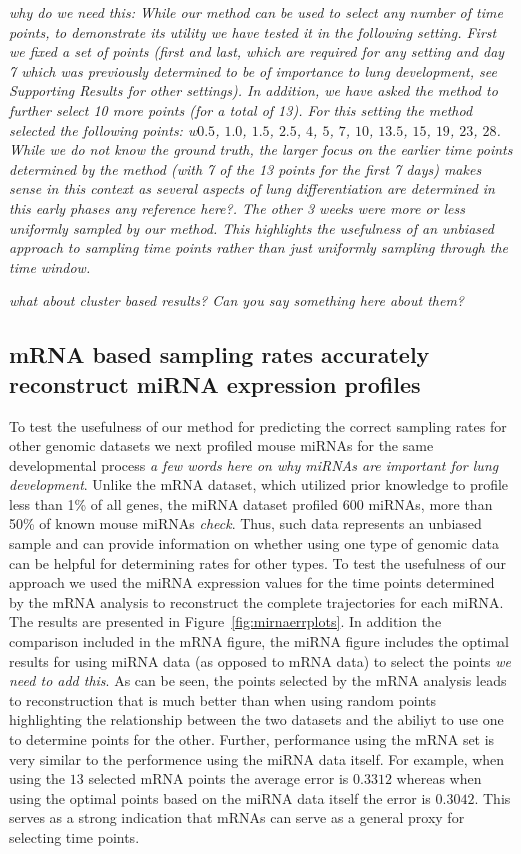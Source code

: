\documentclass[10pt]{article}
\begin{document}
{\em why do we need this: While our method can be used to select any
number of time points, to demonstrate its utility we have tested it
in the following setting. First we fixed a set of points (first and
last, which are required for any setting and day 7 which was
previously determined to be of importance to lung development, see
Supporting Results for other settings). In addition, we have asked
the method to further select 10 more points (for a total of 13). For
this setting the method selected the following points: w$0.5$,
$1.0$, $1.5$, $2.5$, $4$, $5$, $7$, $10$, $13.5$, $15$, $19$, $23$,
$28$. While we do not know the ground truth, the larger focus on the
earlier time points determined by the method (with 7 of the 13
points for the first 7 days) makes sense in this context as several
aspects of lung differentiation are determined in this early phases
{\em any reference here?}. The other 3 weeks were more or less
uniformly sampled by our method. This highlights the usefulness of
an unbiased approach to sampling time points rather than just
uniformly sampling through the time window.}

{\em what about cluster based results? Can you say something here
about them?}
\subsection{mRNA based sampling rates accurately  reconstruct miRNA expression profiles}\label{sec:mirnaexp}

To test the usefulness of our method for predicting the correct
sampling rates for other genomic datasets we next profiled mouse
miRNAs for the same developmental process {\em a few words here on
why miRNAs are important for lung development}. Unlike the mRNA
dataset, which utilized prior knowledge to profile less than 1\% of
all genes, the miRNA dataset profiled 600 miRNAs, more than 50\% of
known mouse miRNAs {\em check}. Thus, such data represents an
unbiased sample and can provide information on whether using one
type of genomic data can be helpful for determining rates for other
types. To test the usefulness of our approach we used the miRNA
expression values for the time points determined by the mRNA
analysis to reconstruct the complete trajectories for each miRNA.
The results are presented in Figure~\ref{fig:mirnaerrplots}. In
addition the comparison included in the mRNA figure, the miRNA
figure includes the optimal results for using miRNA data (as opposed
to mRNA data) to select the points {\em we need to add this}. As can
be seen, the points selected by the mRNA analysis leads to
reconstruction that is much better than when using random points
highlighting the relationship between the two datasets and the
abiliyt to use one to determine points for the other. Further,
performance using the mRNA set is very similar to the performence
using the miRNA data itself. For example, when using the $13$
selected mRNA points the average error is $0.3312$ whereas when
using the optimal points based on the miRNA data itself the error
 is $0.3042$. This serves as  a strong indication that mRNAs can serve as a general proxy for
selecting time points.
\end{document}
